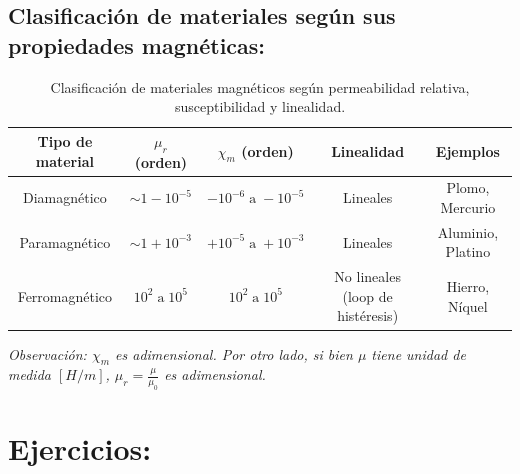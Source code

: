 \documentclass[
  11pt,
  letterpaper,
   answers
  ]{exam}
\begin{document}
\subsection*{Clasificación de materiales según sus propiedades magnéticas:}

\begin{table}[h!]
\centering
\renewcommand{\arraystretch}{1.3}
\begin{tabular}{|c|c|c|c|c|}
\hline
\textbf{Tipo de material} & \(\mu_r\) (orden) & \(\chi_m\) (orden) & \textbf{Linealidad} & \textbf{Ejemplos} \\
\hline
Diamagnético & \(\sim 1 - 10^{-5}\) & \(-10^{-6} \; \text{a} \; -10^{-5}\) & Lineales & Plomo, Mercurio \\
\hline
Paramagnético & \(\sim 1 + 10^{-3}\) & \(+10^{-5} \; \text{a} \; +10^{-3}\) & Lineales & Aluminio, Platino \\
\hline
Ferromagnético & \(10^{2} \; \text{a} \; 10^{5}\) & \(10^{2} \; \text{a} \; 10^{5}\) & No lineales (loop de histéresis) & Hierro, Níquel \\
\hline
\end{tabular}
\caption{Clasificación de materiales magnéticos según permeabilidad relativa, susceptibilidad y linealidad.}
\end{table}
\textit{Observación: $\chi_m$ es adimensional. Por otro lado, si bien $\mu$ tiene unidad de medida $[H/m]$, $\mu_r = \frac{\mu}{\mu_0}$ es adimensional.}



\newpage
\section{Ejercicios:}
\end{document}
